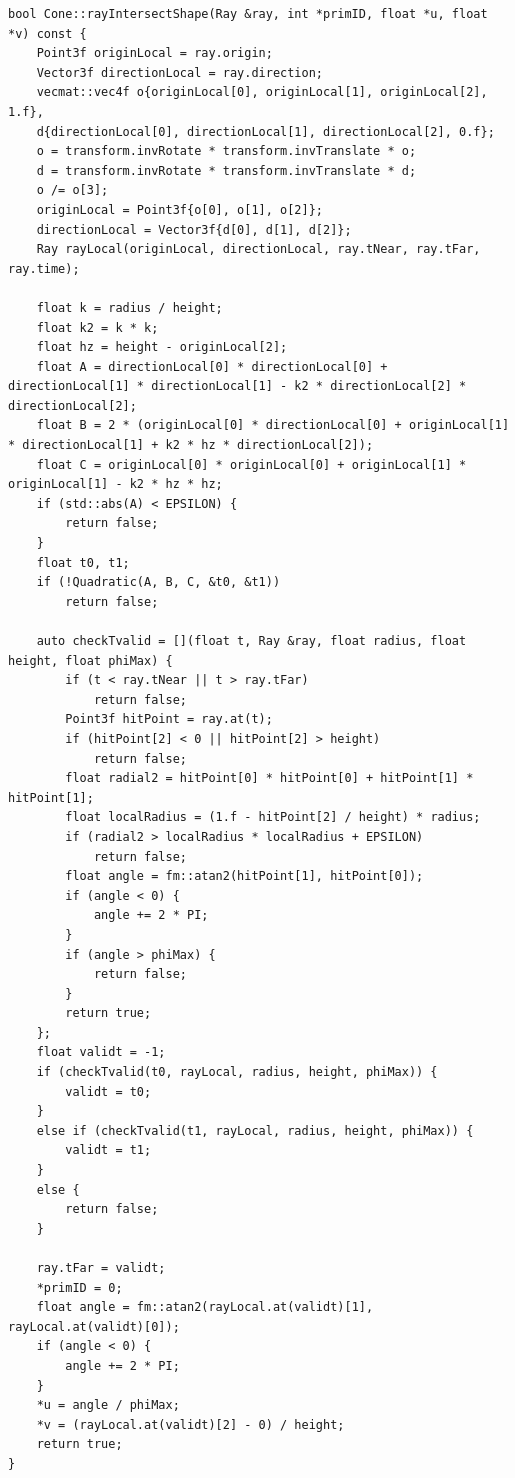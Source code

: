 \documentclass{article}
\begin{document}
\begin{lstlisting}[style=cppstyle]
bool Cone::rayIntersectShape(Ray &ray, int *primID, float *u, float *v) const {
    Point3f originLocal = ray.origin;
    Vector3f directionLocal = ray.direction;
    vecmat::vec4f o{originLocal[0], originLocal[1], originLocal[2], 1.f},
    d{directionLocal[0], directionLocal[1], directionLocal[2], 0.f};
    o = transform.invRotate * transform.invTranslate * o;
    d = transform.invRotate * transform.invTranslate * d;
    o /= o[3];
    originLocal = Point3f{o[0], o[1], o[2]};
    directionLocal = Vector3f{d[0], d[1], d[2]};
    Ray rayLocal(originLocal, directionLocal, ray.tNear, ray.tFar, ray.time);

    float k = radius / height;
    float k2 = k * k;
    float hz = height - originLocal[2];
    float A = directionLocal[0] * directionLocal[0] + directionLocal[1] * directionLocal[1] - k2 * directionLocal[2] * directionLocal[2];
    float B = 2 * (originLocal[0] * directionLocal[0] + originLocal[1] * directionLocal[1] + k2 * hz * directionLocal[2]);
    float C = originLocal[0] * originLocal[0] + originLocal[1] * originLocal[1] - k2 * hz * hz;
    if (std::abs(A) < EPSILON) {
        return false;
    }
    float t0, t1;
    if (!Quadratic(A, B, C, &t0, &t1))
        return false;

    auto checkTvalid = [](float t, Ray &ray, float radius, float height, float phiMax) {
        if (t < ray.tNear || t > ray.tFar)
            return false;
        Point3f hitPoint = ray.at(t);
        if (hitPoint[2] < 0 || hitPoint[2] > height)
            return false;
        float radial2 = hitPoint[0] * hitPoint[0] + hitPoint[1] * hitPoint[1];
        float localRadius = (1.f - hitPoint[2] / height) * radius;
        if (radial2 > localRadius * localRadius + EPSILON)
            return false;
        float angle = fm::atan2(hitPoint[1], hitPoint[0]);
        if (angle < 0) {
            angle += 2 * PI;
        }
        if (angle > phiMax) {
            return false;
        }
        return true;
    };
    float validt = -1;
    if (checkTvalid(t0, rayLocal, radius, height, phiMax)) {
        validt = t0;
    }
    else if (checkTvalid(t1, rayLocal, radius, height, phiMax)) {
        validt = t1;
    }
    else {
        return false;
    }

    ray.tFar = validt;
    *primID = 0;
    float angle = fm::atan2(rayLocal.at(validt)[1], rayLocal.at(validt)[0]);
    if (angle < 0) {
        angle += 2 * PI;
    }
    *u = angle / phiMax;
    *v = (rayLocal.at(validt)[2] - 0) / height;
    return true;
}
\end{lstlisting}
\end{document}
